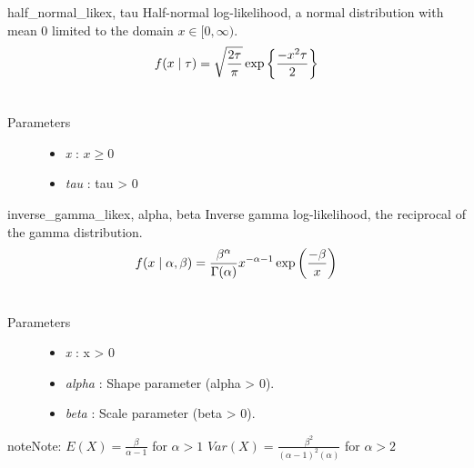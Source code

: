 \hypertarget{pymc.distributions.half_normal_like}{}\begin{funcdesc}{half\_normal\_like}{x, tau}
Half-normal log-likelihood, a normal distribution with mean 0 limited
to the domain $x \in [0, \infty)$.
\begin{gather}
\begin{split}f(x \mid \tau) = \sqrt{\frac{2\tau}{\pi}}\exp\left\{ {\frac{-x^2 \tau}{2}}\right\}\end{split}\notag\\\begin{split}\end{split}\notag
\end{gather}\begin{description}
\item[Parameters] \leavevmode\begin{itemize}
\item {}
\emph{x} : $x \ge 0$

\item {}
\emph{tau} : tau \textgreater{} 0

\end{itemize}

\end{description}
\end{funcdesc}

\hypertarget{pymc.distributions.inverse_gamma_like}{}\begin{funcdesc}{inverse\_gamma\_like}{x, alpha, beta}
Inverse gamma log-likelihood, the reciprocal of the gamma distribution.
\begin{gather}
\begin{split}f(x \mid \alpha, \beta) = \frac{\beta^{\alpha}}{\Gamma(\alpha)} x^{-\alpha - 1} \exp\left(\frac{-\beta}{x}\right)\end{split}\notag\\\begin{split}\end{split}\notag
\end{gather}\begin{description}
\item[Parameters] \leavevmode\begin{itemize}
\item {}
\emph{x} : x \textgreater{} 0

\item {}
\emph{alpha} : Shape parameter (alpha \textgreater{} 0).

\item {}
\emph{beta} : Scale parameter (beta \textgreater{} 0).

\end{itemize}

\end{description}

\begin{notice}{note}{Note:}
$E(X)=\frac{\beta}{\alpha-1}$  for $\alpha > 1$
$Var(X)=\frac{\beta^2}{(\alpha-1)^2(\alpha)}$  for $\alpha > 2$
\end{notice}
\end{funcdesc}

